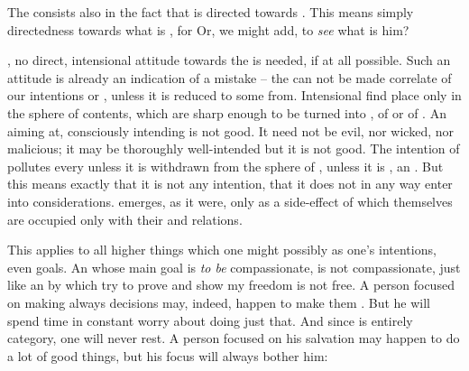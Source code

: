 The  consists also in the fact that  is directed towards
. This means simply directedness towards what is , for
 Or, we might add, to {\em see} what is 
him?


\pa
{}, no direct, intensional attitude towards the  is
needed, if at all possible.  Such an attitude is already an indication of a
mistake -- the  can not be made correlate of our intentions or
, unless it is reduced to some  from.
Intensional  find place only in the sphere of
 contents,  which are sharp enough to be
turned into ,  of  or 
of .
 An  aiming at, consciously intending  is not
good.  It need not be evil, nor wicked, nor malicious; it may be
thoroughly well-intended but it is not good. The intention of
 pollutes every  unless it is withdrawn from
the sphere of , unless it is , an . But this means exactly that it is not any intention, that it
does not in any way enter into  considerations.   emerges, as it were, only as a side-effect of  which
themselves are occupied only with their   and
 relations.

This applies to all higher things which one might possibly  as one's
intentions, even goals.  An  whose main goal is {\em to be}
compassionate, is not compassionate, just like an  by which  try
to prove and show my freedom is not free.
A person focused on making always  decisions may, indeed, happen to
make them . But he will spend time in constant worry about doing just
that. And since  is entirely  category, one will never
rest. A person focused on his salvation may happen to do a lot of good things,
but his focus will always bother him: 

